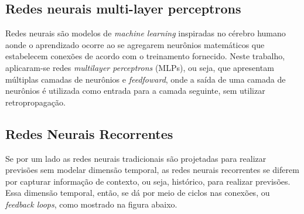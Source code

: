 \subsection{Redes neurais multi-layer perceptrons}
Redes neurais são modelos de \textit{machine learning} 
inspiradas no cérebro humano aonde o aprendizado ocorre 
ao se agregarem neurônios matemáticos que 
estabelecem conexões de acordo com o treinamento fornecido. 
Neste trabalho, aplicaram-se redes 
\textit{multilayer perceptrons} (MLPs), ou seja, que 
apresentam múltiplas camadas de neurônios 
e \textit{feedfoward}, onde a saída de 
uma camada de neurônios é utilizada como entrada para a camada seguinte, sem utilizar retropropagação.
          
        
\subsection{Redes Neurais Recorrentes}
\label{rnn}

Se por um lado as redes neurais tradicionais são projetadas
para realizar previsões sem modelar dimensão temporal, as redes
neurais recorrentes se diferem por capturar informação de contexto, ou seja,
histórico, para realizar previsões. Essa dimensão temporal, então, se dá por 
meio de ciclos nas conexões, ou \textit{feedback loops}, como mostrado na 
figura abaixo.


